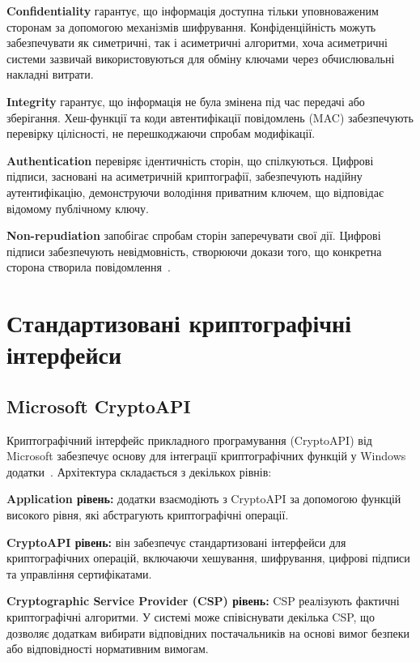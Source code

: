 \textbf{Confidentiality} гарантує, що інформація доступна тільки уповноваженим сторонам за допомогою механізмів шифрування. 
Конфіденційність можуть забезпечувати як симетричні, так і асиметричні алгоритми, хоча асиметричні системи зазвичай 
використовуються для обміну ключами через обчислювальні накладні витрати.

\textbf{Integrity} гарантує, що інформація не була змінена під час передачі або зберігання. Хеш-функції та коди автентифікації 
повідомлень (MAC) забезпечують перевірку цілісності, не перешкоджаючи спробам модифікації.

\textbf{Authentication} перевіряє ідентичність сторін, що спілкуються. Цифрові підписи, засновані на асиметричній 
криптографії, забезпечують надійну аутентифікацію, демонструючи володіння приватним ключем, що відповідає відомому 
публічному ключу.

\textbf{Non-repudiation} запобігає спробам сторін заперечувати свої дії. Цифрові підписи забезпечують невідмовність, 
створюючи докази того, що конкретна сторона створила повідомлення~\cite{stallings2017}.

\section{Стандартизовані криптографічні інтерфейси}

\subsection{Microsoft CryptoAPI}

Криптографічний інтерфейс прикладного програмування (CryptoAPI) від Microsoft забезпечує основу для інтеграції 
криптографічних функцій у Windows додатки~\cite{cryptoapi}. Архітектура складається з декількох рівнів:

\textbf{Application рівень:} додатки взаємодіють з CryptoAPI за допомогою функцій високого рівня, які абстрагують
криптографічні операції.

\textbf{CryptoAPI рівень:} він забезпечує стандартизовані інтерфейси для криптографічних операцій,
включаючи хешування, шифрування, цифрові підписи та управління сертифікатами.

\textbf{Cryptographic Service Provider (CSP) рівень:} CSP реалізують фактичні криптографічні алгоритми. У системі може 
співіснувати декілька CSP, що дозволяє додаткам вибирати відповідних постачальників на основі вимог безпеки або 
відповідності нормативним вимогам.

